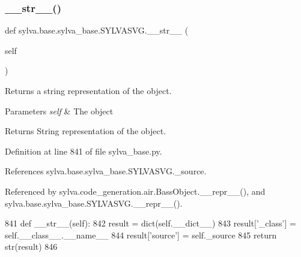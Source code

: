 \subsubsection{\texorpdfstring{\+\_\+\+\_\+str\+\_\+\+\_\+()}{\_\_str\_\_()}}
{\footnotesize\ttfamily def sylva.\+base.\+sylva\+\_\+base.\+S\+Y\+L\+V\+A\+S\+V\+G.\+\_\+\+\_\+str\+\_\+\+\_\+ (\begin{DoxyParamCaption}\item[{}]{self }\end{DoxyParamCaption})}



Returns a string representation of the object. 


\begin{DoxyParams}{Parameters}
{\em self} & The object\\
\hline
\end{DoxyParams}
\begin{DoxyReturn}{Returns}
String representation of the object. 
\end{DoxyReturn}


Definition at line 841 of file sylva\+\_\+base.\+py.



References sylva.\+base.\+sylva\+\_\+base.\+S\+Y\+L\+V\+A\+S\+V\+G.\+\_\+source.



Referenced by sylva.\+code\+\_\+generation.\+air.\+Bass\+Object.\+\_\+\+\_\+repr\+\_\+\+\_\+(), and sylva.\+base.\+sylva\+\_\+base.\+S\+Y\+L\+V\+A\+S\+V\+G.\+\_\+\+\_\+repr\+\_\+\+\_\+().


\begin{DoxyCode}
841     \textcolor{keyword}{def }\_\_str\_\_(self):
842         result = dict(self.\_\_dict\_\_)
843         result[\textcolor{stringliteral}{'\_class'}] = self.\_\_class\_\_.\_\_name\_\_
844         result[\textcolor{stringliteral}{'source'}] = self.\_source
845         \textcolor{keywordflow}{return} str(result)
846 
\end{DoxyCode}
\mbox{\label{classsylva_1_1base_1_1sylva__base_1_1_s_y_l_v_a_s_v_g_ab5193e954ce5acbbf148e9874c0637e5}} 
